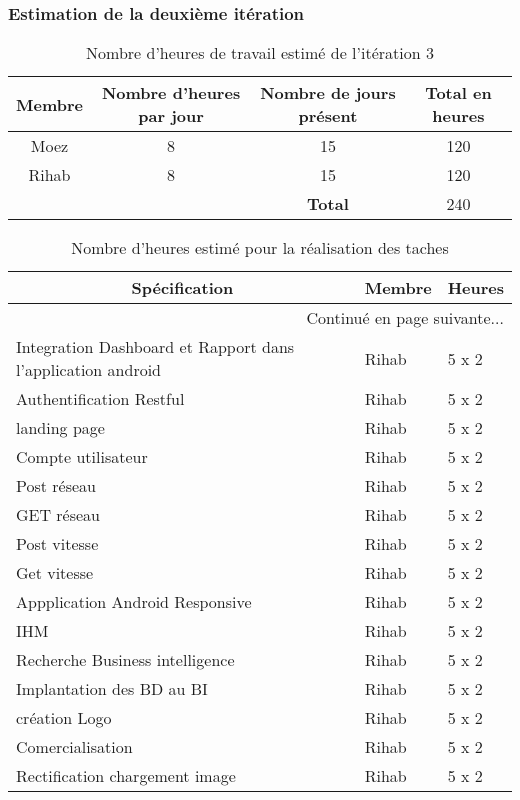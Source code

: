 \subsubsection{Estimation de la deuxième itération}
\begin{table}[htbp]
    \centering
    \begin{tabular}{| c | c | c | c |}
\hline
\textbf{Membre} & \textbf{Nombre d'heures par jour} & \textbf{Nombre de jours présent} & \textbf{Total en heures} \\ \hline
\hline

Moez & 8 & 15 & 120\\ \hline
Rihab & 8 & 15 & 120 \\ \hline
\multicolumn{2}{c|}{} & \textbf{Total} & 240 \\ \cline{3-4}
    \end{tabular}
    \caption{Nombre d'heures de travail estimé de l'itération 3}
    \label{tab:sprint3-capacity}
\end{table}

\begin{center}
    \begin{longtable}{| l | l | l |}
        \caption{Nombre d'heures estimé pour la réalisation des taches}
        \label{tab:sprint3-estimation} \\

 \hline
 \multicolumn{1}{|c}{\textbf{Spécification}} &
 \multicolumn{1}{|c}{\textbf{Membre}} &
 \multicolumn{1}{|c|}{\textbf{Heures}} \\ \hline
 \endhead

 \hline \multicolumn{3}{|r|}{{Continué en page suivante$\dotsc$}} \\ \hline
 \endfoot

 \hline \hline
 \endlastfoot

\hline
Integration Dashboard et Rapport dans l'application android & Rihab & 5 x 2 \\ \hline
Authentification Restful& Rihab & 5 x 2 \\ \hline
landing page& Rihab & 5 x 2 \\ \hline
Compte utilisateur& Rihab & 5 x 2 \\ \hline
Post réseau& Rihab & 5 x 2 \\ \hline
GET réseau& Rihab & 5 x 2 \\ \hline
Post vitesse& Rihab & 5 x 2 \\ \hline
Get vitesse& Rihab & 5 x 2 \\ \hline
Appplication Android Responsive & Rihab & 5 x 2 \\ \hline
IHM & Rihab & 5 x 2 \\ \hline
Recherche Business intelligence& Rihab & 5 x 2 \\ \hline
Implantation des BD au BI& Rihab & 5 x 2 \\ \hline
création Logo& Rihab & 5 x 2 \\ \hline
Comercialisation& Rihab & 5 x 2 \\ \hline
Rectification chargement image & Rihab & 5 x 2 \\ \hline
\end{longtable}
\end{center}
